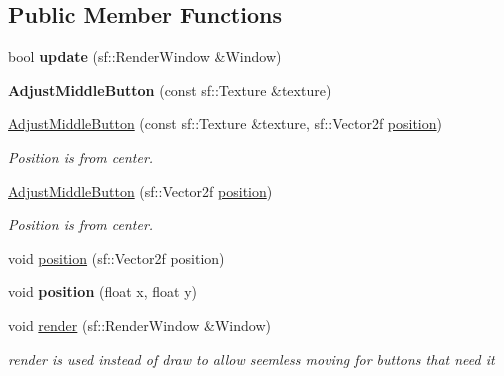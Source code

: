 \subsection*{Public Member Functions}
\begin{DoxyCompactItemize}
\item 
\hypertarget{class_adjust_middle_button_a9946c953357138786dbcd91c7c72bfd7}{bool {\bfseries update} (sf\-::\-Render\-Window \&Window)}\label{class_adjust_middle_button_a9946c953357138786dbcd91c7c72bfd7}

\item 
\hypertarget{class_adjust_middle_button_abb760233fcd96e9efed1271e23727891}{{\bfseries Adjust\-Middle\-Button} (const sf\-::\-Texture \&texture)}\label{class_adjust_middle_button_abb760233fcd96e9efed1271e23727891}

\item 
\hypertarget{class_adjust_middle_button_a0d20b68fa8981fdc61811b4a2fa557e1}{\hyperlink{class_adjust_middle_button_a0d20b68fa8981fdc61811b4a2fa557e1}{Adjust\-Middle\-Button} (const sf\-::\-Texture \&texture, sf\-::\-Vector2f \hyperlink{class_adjust_middle_button_a9a89c5d3f24d0fe7e85d5eb1c6d16110}{position})}\label{class_adjust_middle_button_a0d20b68fa8981fdc61811b4a2fa557e1}

\begin{DoxyCompactList}\small\item\em Position is from center. \end{DoxyCompactList}\item 
\hypertarget{class_adjust_middle_button_a1b10b9e9fa40fc575cdb664aacd0cbc0}{\hyperlink{class_adjust_middle_button_a1b10b9e9fa40fc575cdb664aacd0cbc0}{Adjust\-Middle\-Button} (sf\-::\-Vector2f \hyperlink{class_adjust_middle_button_a9a89c5d3f24d0fe7e85d5eb1c6d16110}{position})}\label{class_adjust_middle_button_a1b10b9e9fa40fc575cdb664aacd0cbc0}

\begin{DoxyCompactList}\small\item\em Position is from center. \end{DoxyCompactList}\item 
void \hyperlink{class_adjust_middle_button_a9a89c5d3f24d0fe7e85d5eb1c6d16110}{position} (sf\-::\-Vector2f position)
\item 
\hypertarget{class_adjust_middle_button_aaa0ebf98f00093ec9c9bfe1e0fc92793}{void {\bfseries position} (float x, float y)}\label{class_adjust_middle_button_aaa0ebf98f00093ec9c9bfe1e0fc92793}

\item 
\hypertarget{class_adjust_middle_button_a80d1f7ea96d67dd35d5dd41ef3a82485}{void \hyperlink{class_adjust_middle_button_a80d1f7ea96d67dd35d5dd41ef3a82485}{render} (sf\-::\-Render\-Window \&Window)}\label{class_adjust_middle_button_a80d1f7ea96d67dd35d5dd41ef3a82485}

\begin{DoxyCompactList}\small\item\em render is used instead of draw to allow seemless moving for buttons that need it \end{DoxyCompactList}\end{DoxyCompactItemize}

